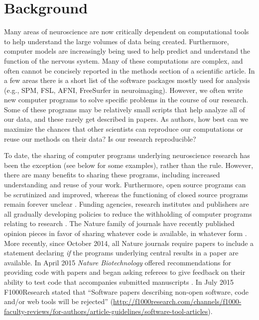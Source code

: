 \documentclass[11pt]{article}
\begin{document}
\clearpage


\renewcommand{\cite}[1]{\autocite{#1}}

\linenumbers

\section*{Background}

Many areas of neuroscience are now critically dependent on
computational tools to help understand the large volumes of data being
created.  Furthermore, computer models are increasingly being used to
help predict and understand the function of the nervous system.  Many
of these computations are complex, and often cannot be concisely
reported in the methods section of a scientific article.  In a few
areas there is a short list of the software packages mostly used for
analysis (e.g., SPM, FSL, AFNI, FreeSurfer in neuroimaging).  However,
we often write new computer programs to solve specific problems in the
course of our research.  Some of these programs may be relatively
small scripts that help analyze all of our data, and these rarely get
described in papers.  As authors, how best can we maximize the chances
that other scientists can reproduce our computations or reuse our
methods on their data?  Is our research reproducible?

To date, the sharing of computer programs underlying neuroscience
research has been the exception (see below for some examples), rather than the rule.  However, there
are many benefits to sharing these programs, including increased
understanding and reuse of your work.  Furthermore, open source programs can be scrutinized and improved, whereas the functioning of closed source
programs remain forever unclear \cite{Vihinen2015}.  Funding agencies, research institutes and publishers are all gradually developing policies to
reduce the withholding of computer programs relating to research
\cite{Morin2012-65e}.  The Nature family of journals have recently
published opinion pieces in favor of sharing whatever code is
available, in whatever form \cite{Barnes2010-iv,Ince2012-225}.  More
recently, since October 2014, all Nature journals require papers to
include a statement declaring \textit{if} the programs underlying central
results in a paper are available. In April 2015 \textit{Nature Biotechnology} offered recommendations for providing code with papers and began asking referees to give feedback on their ability to test code that accompanies submitted manuscripts \cite{NatBiotech2015}.
In July 2015 F1000Research stated that ``Software papers describing non-open software, code and/or web tools will be rejected'' (\url{http://f1000research.com/channels/f1000-faculty-reviews/for-authors/article-guidelines/software-tool-articles}).
\end{document}
